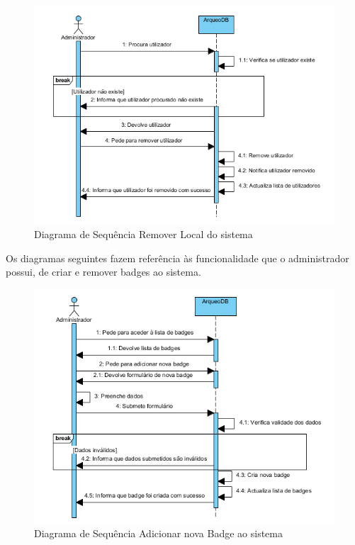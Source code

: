 ﻿\documentclass[12pt,a4paper]{article}
\begin{document}
\begin{figure}[h!]
\centering
\includegraphics[scale=1]{sequencia/A_removerlocal}
\caption{Diagrama de Sequência Remover Local do sistema} 
\end{figure}

\clearpage
Os diagramas seguintes fazem referência às funcionalidade que o administrador possui, de criar e remover badges ao sistema.\\

\begin{figure}[h!]
\centering
\includegraphics[scale=1]{sequencia/A_criarbadge}
\caption{Diagrama de Sequência Adicionar nova Badge ao sistema} 
\end{figure}  
\end{document}
